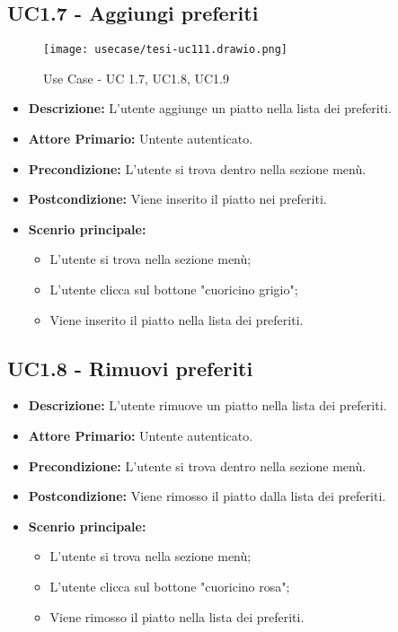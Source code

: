 \subsection{UC1.7 - Aggiungi preferiti}
\begin{figure}[H]
    \centering
    \texttt{[image: usecase/tesi-uc111.drawio.png]}
    \caption{Use Case - UC 1.7, UC1.8, UC1.9}
\end{figure}
\begin{itemize}
    \item \textbf{Descrizione:} L'utente aggiunge un piatto nella lista dei preferiti.
    \item \textbf{Attore Primario:} Untente autenticato.
    \item \textbf{Precondizione:} L'utente si trova dentro nella sezione menù.
    \item \textbf{Postcondizione:} Viene inserito il piatto nei preferiti.
    \item \textbf{Scenrio principale:}
    \begin{itemize}
        \item L'utente si trova nella sezione menù;
        \item L'utente clicca sul bottone "cuoricino grigio";
        \item Viene inserito il piatto nella lista dei preferiti.
    \end{itemize}
\end{itemize}
\subsection{UC1.8 - Rimuovi preferiti}
\begin{itemize}
    \item \textbf{Descrizione:} L'utente rimuove un piatto nella lista dei preferiti.
    \item \textbf{Attore Primario:} Untente autenticato.
    \item \textbf{Precondizione:} L'utente si trova dentro nella sezione menù.
    \item \textbf{Postcondizione:} Viene rimosso il piatto dalla lista dei preferiti.
    \item \textbf{Scenrio principale:}
    \begin{itemize}
        \item L'utente si trova nella sezione menù;
        \item L'utente clicca sul bottone "cuoricino rosa";
        \item Viene rimosso il piatto nella lista dei preferiti.
    \end{itemize}
\end{itemize}
